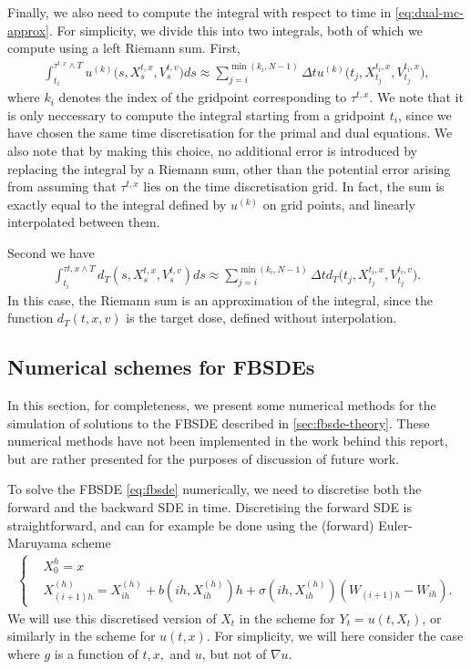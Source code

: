 Finally, we also need to compute the integral with respect to time in \autoref{eq:dual-mc-approx}. For simplicity, we divide this into two integrals, both of which we compute using a left Riemann sum. First,
%
\begin{align}
    \int_{t_i}^{\tau^{t,x}\wedge T} u^{(k)}\big(s,X_s^{t,x},V_s^{t,v}\big) ds \approx \sum_{j=i}^{\min{(k_i,N-1)}} \Delta t u^{(k)}\big(t_j,X_{t_j}^{t_i,x},V_{t_j}^{t_i,x}\big),
\end{align}
% 
where $k_i$ denotes the index of the gridpoint corresponding to $\tau^{t,x}$. We note that it is only neccessary to compute the integral starting from a gridpoint $t_i$, since we have chosen the same time discretisation for the primal and dual equations. We also note that by making this choice, no additional error is introduced by replacing the integral by a Riemann sum, other than the potential error arising from assuming that $\tau^{t,x}$ lies on the time discretisation grid. In fact, the sum is exactly equal to the integral defined by $u^{(k)}$ on grid points, and linearly interpolated between them. 

Second we have
%
\begin{align}
    \int_{t_i}^{\tau{t,x}\wedge T} d_T(s,X_s^{t,x},V_s^{t,v}) ds \approx \sum_{j=i}^{\min{(k_i,N-1)}} \Delta t d_T\big(t_j,X_{t_j}^{t_i,x},V_{t_j}^{t_i,v}\big).
\end{align}
%
In this case, the Riemann sum is an approximation of the integral, since the function $d_T(t,x,v)$ is the target dose, defined without interpolation.

%

\subsection{Numerical schemes for FBSDEs}
In this section, for completeness, we present some numerical methods for the simulation of solutions to the FBSDE described in \autoref{sec:fbsde-theory}. These numerical methods have not been implemented in the work behind this report, but are rather presented for the purposes of discussion of future work.

To solve the FBSDE \autoref{eq:fbsde} numerically, we need to discretise both the forward and the backward SDE in time. Discretising the forward SDE is straightforward, and can for example be done using the (forward) Euler-Maruyama scheme
%
\begin{align} 
    \begin{cases}
    &X_0^{h} = x\\
    &X_{(i+1)h}^{(h)} = X_{ih}^{(h)} + b(ih,X_{ih}^{(h)}) h + \sigma(ih,X_{ih}^{(h)})(W_{(i+1)h}-W_{ih}).
    \end{cases}
\end{align}
%
We will use this discretised version of $X_t$ in the scheme for $Y_t=u(t,X_t)$, or similarly in the scheme for $u(t,x)$. For simplicity, we will here consider the case where $g$ is a function of $t,x,$ and $u$, but not of $\nabla u$.

